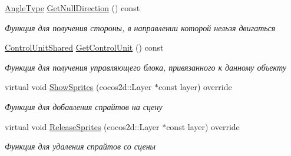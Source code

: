 \begin{DoxyCompactItemize}
\hyperlink{namespacertm_a69dc82b16a0148c10962caa83d930f89}{Angle\+Type} \hyperlink{classrtm_1_1_crossroad_object_a73d0e929640d8aa804122d8e0ab5e961}{Get\+Null\+Direction} () const
\begin{DoxyCompactList}\small\item\em Функция для получения стороны, в направлении которой нельзя двигаться \end{DoxyCompactList}\item 
\hyperlink{namespacertm_a64296d558b2fa02bbf5870afffd61fd9}{Control\+Unit\+Shared} \hyperlink{classrtm_1_1_crossroad_object_a7169a01dc0623fc2701aa184a858be49}{Get\+Control\+Unit} () const
\begin{DoxyCompactList}\small\item\em Функция для получения управляющего блока, привязанного к данному объекту \end{DoxyCompactList}\item 
virtual void \hyperlink{classrtm_1_1_crossroad_object_a2de2a5dac2ba2ca573cfa65a2633de9b}{Show\+Sprites} (cocos2d\+::\+Layer $\ast$const layer) override
\begin{DoxyCompactList}\small\item\em Функция для добавления спрайтов на сцену \end{DoxyCompactList}\item 
virtual void \hyperlink{classrtm_1_1_crossroad_object_a92e9357697edecc69564fd4d40524a3b}{Release\+Sprites} (cocos2d\+::\+Layer $\ast$const layer) override
\begin{DoxyCompactList}\small\item\em Функция для удаления спрайтов со сцены \end{DoxyCompactList}\end{DoxyCompactItemize}
